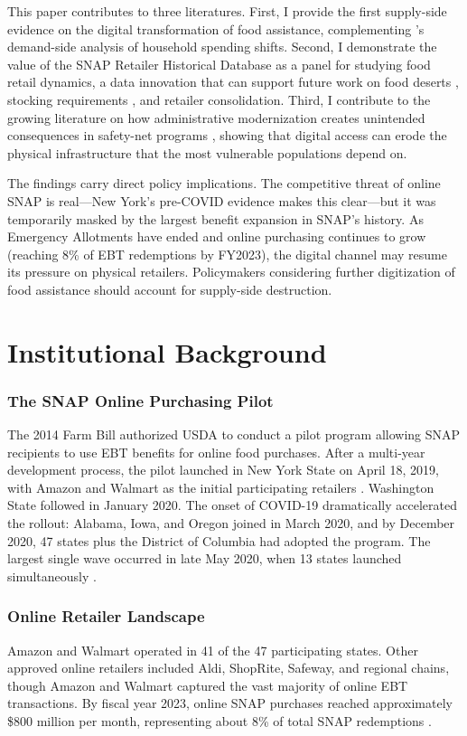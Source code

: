 \documentclass[12pt]{article}
\begin{document}
This paper contributes to three literatures. First, I provide the first supply-side evidence on the digital transformation of food assistance, complementing \citet{pukelis_2024}'s demand-side analysis of household spending shifts. Second, I demonstrate the value of the SNAP Retailer Historical Database as a panel for studying food retail dynamics, a data innovation that can support future work on food deserts \citep{allcott_2019}, stocking requirements \citep{usda_stocking_2016}, and retailer consolidation. Third, I contribute to the growing literature on how administrative modernization creates unintended consequences in safety-net programs \citep{herd_2019, deshpande_2019, gray_2023}, showing that digital access can erode the physical infrastructure that the most vulnerable populations depend on.

The findings carry direct policy implications. The competitive threat of online SNAP is real---New York's pre-COVID evidence makes this clear---but it was temporarily masked by the largest benefit expansion in SNAP's history. As Emergency Allotments have ended and online purchasing continues to grow (reaching 8\% of EBT redemptions by FY2023), the digital channel may resume its pressure on physical retailers. Policymakers considering further digitization of food assistance should account for supply-side destruction.


\section{Institutional Background}

\subsubsection*{The SNAP Online Purchasing Pilot} The 2014 Farm Bill authorized USDA to conduct a pilot program allowing SNAP recipients to use EBT benefits for online food purchases. After a multi-year development process, the pilot launched in New York State on April 18, 2019, with Amazon and Walmart as the initial participating retailers \citep{usda_online_2019}. Washington State followed in January 2020. The onset of COVID-19 dramatically accelerated the rollout: Alabama, Iowa, and Oregon joined in March 2020, and by December 2020, 47 states plus the District of Columbia had adopted the program. The largest single wave occurred in late May 2020, when 13 states launched simultaneously \citep{jones_2024}.

\subsubsection*{Online Retailer Landscape} Amazon and Walmart operated in 41 of the 47 participating states. Other approved online retailers included Aldi, ShopRite, Safeway, and regional chains, though Amazon and Walmart captured the vast majority of online EBT transactions. By fiscal year 2023, online SNAP purchases reached approximately \$800 million per month, representing about 8\% of total SNAP redemptions \citep{usda_opp_2024}.
\end{document}
